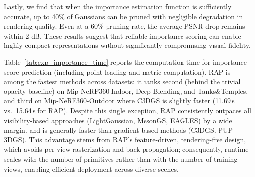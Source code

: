 Lastly, we find that when the importance estimation function is sufficiently accurate, up to 40\% of Gaussians can be pruned with negligible degradation in rendering quality. Even at a 60\% pruning rate, the average PSNR drop remains within 2 dB. These results suggest that reliable importance scoring can enable highly compact representations without significantly compromising visual fidelity.

\begin{table}[]
    \centering
    \caption{Importance score computation time (seconds).}
    \label{tab:exp_importance_time}
    \vspace{-1.5em}
\end{table}

Table~\ref{tab:exp_importance_time} reports the computation time for importance score prediction (including point loading and metric computation). 
RAP is among the fastest methods across datasets: it ranks second (behind the trivial opacity baseline) on Mip-NeRF360-Indoor, Deep Blending, and Tanks\&Temples, and third on Mip-NeRF360-Outdoor where C3DGS is slightly faster (11.69\,s vs.\ 15.64\,s for RAP). 
Despite this single exception, RAP consistently outpaces all visibility-based approaches (LightGaussian, MesonGS, EAGLES) by a wide margin, and is generally faster than gradient-based methods (C3DGS, PUP-3DGS). 
This advantage stems from RAP’s feature-driven, rendering-free design, which avoids per-view rasterization and back-propagation; consequently, runtime scales with the number of primitives rather than with the number of training views, enabling efficient deployment across diverse scenes.

